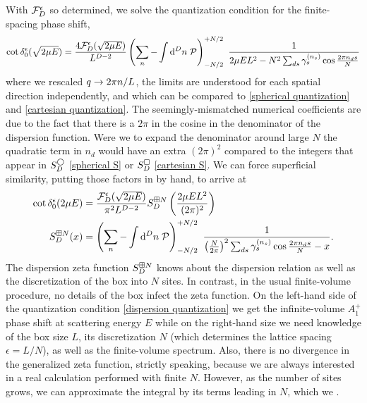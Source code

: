 With $\mathcal{F}_D^\epsilon$ so determined, we solve the quantization condition for the finite-spacing phase shift,
\begin{align}
    \cot \delta_0^\epsilon(\sqrt{2\mu E})
    =
    \frac{4\mathcal{F}_D^\epsilon(\sqrt{2\mu E})}{L^{D-2}}
    \left(\sum_n - \int \mathrm{d}^D n\; \mathcal{P} \right)_{-N/2}^{+N/2}\  \frac{1}{2\mu E L^2 - N^2 \sum_{ds} \gamma^{({n_s})}_s \cos \frac{2\pi n_d s}{N}}
\end{align}
where we rescaled $q\rightarrow 2\pi n/L$, the limits are understood for each spatial direction independently, and which can be compared to \eqref{spherical quantization} and \eqref{cartesian quantization}.  The seemingly-mismatched numerical coefficients are due to the fact that there is a $2\pi$ in the cosine in the denominator of the dispersion function.
Were we to expand the denominator around large $N$ the quadratic term in $n_d$ would have an extra $(2\pi)^2$ compared to the integers that appear in $S^\bigcirc_D$ \eqref{spherical S} or $S^\square_D$ \eqref{cartesian S}.  We can force superficial similarity, putting those factors in by hand, to arrive at
\begin{align}
    \label{eq:dispersion quantization}
    \cot \delta_0^{\epsilon}( 2\mu E ) &= \frac{\mathcal{F}_D^\epsilon(\sqrt{2\mu E})}{\pi^2 L^{D-2}} S^{\boxplus N}_{D}\left(\frac{2\mu E L^2}{(2\pi)^2}\right)
    \\
    \label{eq:dispersion S}
    S^{\boxplus N}_{D}( x )
    &=
    \left(\sum_n - \int \mathrm{d}^D n\; \mathcal{P} \right)_{-N/2}^{+N/2}\  \frac{1}{\left(\frac{N}{2\pi}\right)^2 \sum_{ds} \gamma^{({n_s})}_s \cos \frac{2\pi n_d s}{N} - x}.
\end{align}
The dispersion zeta function $S^{\boxplus N}_{D}$ knows about the dispersion relation as well as the discretization of the box into $N$ sites.
In contrast, in the usual finite-volume procedure, no details of the box infect the zeta function.
On the left-hand side of the quantization condition \eqref{dispersion quantization} we get the infinite-volume $A_1^+$ phase shift at scattering energy $E$ while on the right-hand size we need knowledge of the box size $L$, its discretization $N$ (which determines the lattice spacing $\epsilon=L/N$), as well as the finite-volume spectrum.
Also, there is no divergence in the generalized zeta function, strictly speaking, because we are always interested in a real calculation performed with finite $N$.
However, as the number of sites grows, we can approximate the integral by its terms leading in $N$, which we .

